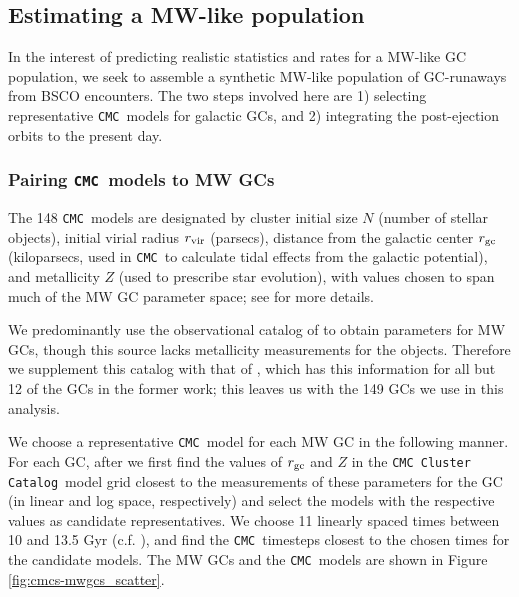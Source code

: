 \documentclass[twocolumn]{aastex631}
\newcommand{\CMC}{\texttt{CMC}}
\newcommand{\CMCcat}{\texttt{CMC Cluster Catalog}}
\begin{document}
\subsection{Estimating a MW-like population} \label{subsec:est_MW-like}

In the interest of predicting realistic statistics and rates for a MW-like GC population, we seek to assemble a synthetic MW-like population of GC-runaways from BSCO encounters.
The two steps involved here are 1) selecting representative \CMC\ models for galactic GCs, and 2) integrating the post-ejection orbits to the present day.

\subsubsection{Pairing \CMC\ models to MW GCs} \label{subsubsec:pairing}

The 148 \CMC\ models are designated by cluster initial size $N$ (number of stellar objects), initial virial radius $r_{\rm vir}$ (parsecs), distance from the galactic center $r_{\rm gc}$ (kiloparsecs, used in \CMC\ to calculate tidal effects from the galactic potential), and metallicity $Z$ (used to prescribe star evolution), with values chosen to span much of the MW GC parameter space; see \citet{2020IAUS..351..357K} for more details.

We predominantly use the observational catalog of \citet{2018MNRAS.478.1520B} to obtain parameters for MW GCs, though this source lacks metallicity measurements for the objects.
Therefore we supplement this catalog with that of \citet{2010arXiv1012.3224H}, which has this information for all but 12 of the GCs in the former work; this leaves us with the 149 GCs we use in this analysis.

We choose a representative \CMC\ model for each MW GC in the following manner.
For each GC, after \citet{2021ApJ...912..102R} we first find the values of $r_{\rm gc}$ and $Z$ in the \CMCcat\ model grid closest to the measurements of these parameters for the GC (in linear and log space, respectively) and select the models with the respective values as candidate representatives.
We choose 11 linearly spaced times between 10 and 13.5 Gyr (c.f. \citet{2013ApJ...775..134V}), and find the \CMC\ timesteps closest to the chosen times for the candidate models.
The MW GCs and the \CMC\ models are shown in Figure \ref{fig:cmcs-mwgcs_scatter}.
\end{document}
